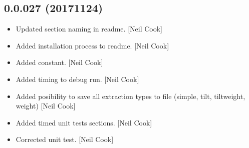 \documentclass[a4paper,10pt,english]{report}
\begin{document}
\subsection{0.0.027 (2017\sphinxhyphen{}11\sphinxhyphen{}24)}
\label{\detokenize{misc/changelog:id544}}\begin{itemize}
\item {} 
Updated section naming in readme. {[}Neil Cook{]}

\item {} 
Added installation process to readme. {[}Neil Cook{]}

\item {} 
Added  constant. {[}Neil Cook{]}

\item {} 
Added timing to debug run. {[}Neil Cook{]}

\item {} 
Added posibility to save all extraction types to file (simple, tilt,
tiltweight, weight) {[}Neil Cook{]}

\item {} 
Added timed unit tests sections. {[}Neil Cook{]}

\item {} 
Corrected unit test. {[}Neil Cook{]}

\end{itemize}
\end{document}
